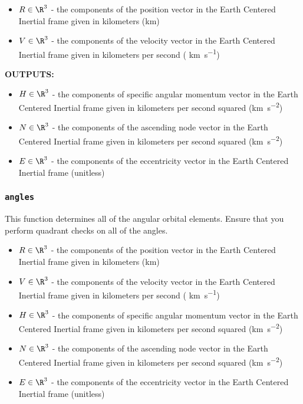 \documentclass[11pt, reqno]{article}    %
\begin{document}
\begin{itemize}
    \item \( R \in \R^{3} \) - the components of the position vector in the Earth Centered Inertial frame given in kilometers (\si{\kilo\meter})
    \item \( V \in \R^{3} \) - the components of the velocity vector in the Earth Centered Inertial frame given in kilometers per second ( \si{\kilo\meter\per\second})
\end{itemize}

\noindent \textbf{OUTPUTS:}
\begin{itemize}
    \item \( H \in \R^{3} \) - the components of specific angular momentum vector in the Earth Centered Inertial frame given in kilometers per second squared (\si{\kilo\meter\per\second\squared})
    \item \( N \in \R^{3} \) - the components of the ascending node vector in the Earth Centered Inertial frame given in kilometers per second squared (\si{\kilo\meter\per\second\squared})
    \item \( E \in \R^{3} \) - the components of the eccentricity vector in the Earth Centered Inertial frame (unitless)
\end{itemize}

\subsubsection*{\texttt{angles}}

This function determines all of the angular orbital elements. 
Ensure that you perform quadrant checks on all of the angles.

\begin{itemize}
    \item \( R \in \R^{3} \) - the components of the position vector in the Earth Centered Inertial frame given in kilometers (\si{\kilo\meter})
    \item \( V \in \R^{3} \) - the components of the velocity vector in the Earth Centered Inertial frame given in kilometers per second ( \si{\kilo\meter\per\second})
    \item \( H \in \R^{3} \) - the components of specific angular momentum vector in the Earth Centered Inertial frame given in kilometers per second squared (\si{\kilo\meter\per\second\squared})
    \item \( N \in \R^{3} \) - the components of the ascending node vector in the Earth Centered Inertial frame given in kilometers per second squared (\si{\kilo\meter\per\second\squared})
    \item \( E \in \R^{3} \) - the components of the eccentricity vector in the Earth Centered Inertial frame (unitless)
\end{itemize}
\end{document}
